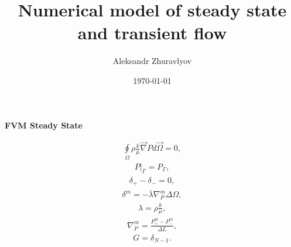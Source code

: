 \documentclass[a4paper,12pt]{extreport}
\author{Aleksandr Zhuravlyov}
\title{Numerical model of steady state and transient flow}
\date{\today}
\begin{document}
    \pagecolor{pageColor}
    \color{fontColor}

    \begin{multicols}{2}
        \begin{center}
        {\large \textbf{FVM Steady State}}
        \end{center}
        \begin{eqnarray}
            \label{eq:poisson_integral}
            \oint \limits_{\Omega} \rho \frac{k}{\mu} \vec{\nabla}P d\vec{\Omega} = 0,
        \end{eqnarray}
        \begin{eqnarray}
            \label{eq:poisson_integral_bound}
            P \Big|_\Gamma = P_\Gamma,
        \end{eqnarray}
        \begin{eqnarray}
            \label{eq:poisson_integral_num}
            \delta_{+} - \delta_{-} = 0,
        \end{eqnarray}
        \begin{eqnarray}
            \label{eq:delta}
            \delta^{m} = -\overline{\lambda} \nabla^{m}_{P}\Delta \Omega,
        \end{eqnarray}
        \begin{eqnarray}
            \label{eq:lambda}
            \lambda = \rho \frac{k}{\mu},
        \end{eqnarray}
        \begin{eqnarray}
            \label{eq:nabla_P_num}
            \nabla^{m}_{P} = \frac{P^{m}_{+} - P^{m}_{-}}{\Delta L},
        \end{eqnarray}
        \begin{eqnarray}
            \label{eq:Consumption_poisson_integral}
            G = \delta_{N-1}.
        \end{eqnarray}


\end{multicols}
\end{document}
